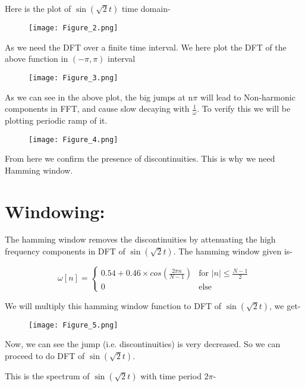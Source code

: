 \documentclass[12pt]{article}
\begin{document}
\newpage
Here is the plot of $\sin(\sqrt{2}t)$ time domain-
\begin{figure}[h!]
\centering
\texttt{[image: Figure\_2.png]}
\label{fig:exemplo}
\end{figure}

As we need the DFT over a finite time interval. We here plot the DFT of the above function in $(-\pi,\pi)$ interval
\begin{figure}[h!]
\centering
\texttt{[image: Figure\_3.png]}
\label{fig:exemplo}
\end{figure}

\newpage
As we can see in the above plot, the big jumps at n$\pi$ will lead to Non-harmonic components in FFT, and cause slow decaying with $\frac{1}{\omega}$. To verify this we will be plotting periodic ramp of it.

\begin{figure}[h!]
\centering
\texttt{[image: Figure\_4.png]}
\label{fig:exemplo}
\end{figure}

From here we confirm the presence of discontinuities. This is why we need Hamming window.

\newpage
\section*{Windowing:}
The hamming window removes the discontinuities by attenuating the high frequency components in DFT of $\sin(\sqrt{2}t)$. The hamming window given is-

  \begin{equation}
    \omega[n]=
    \begin{cases}
      0.54+0.46\times cos(\frac{2\pi n}{N-1}) & \text{for } |n|\leq\frac{N-1}{2} \\
      0  & \text{else } 
    \end{cases}
  \end{equation}
  
We will multiply this hamming window function to DFT of $\sin(\sqrt{2}t)$, we get-  
\begin{figure}[h!]
\centering
\texttt{[image: Figure\_5.png]}
\label{fig:exemplo}
\end{figure}

Now, we can see the jump (i.e. discontinuities) is very decreased. So we can proceed to do DFT of $\sin(\sqrt{2}t)$.

\newpage
This is the spectrum of $\sin(\sqrt{2}t)$ with time period $2\pi$-
\end{document}
